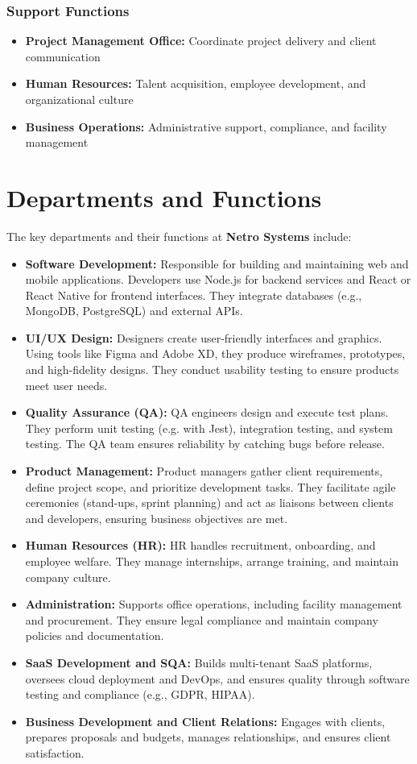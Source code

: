 \documentclass[12pt,a4paper]{report}
\newcommand{\company}[1]{\textcolor{companycolor}{\textbf{#1}}}
\newcommand{\skill}[1]{\textcolor{skillcolor}{\textbf{#1}}}
\newenvironment{coloritemize}
{\begin{itemize}[label=\textcolor{primaryblue}{$\bullet$}]}
{\end{itemize}}
\begin{document}
\subsubsection{Support Functions}
\begin{coloritemize}
    \item \skill{Project Management Office:} Coordinate project delivery and client communication
    \item \skill{Human Resources:} Talent acquisition, employee development, and organizational culture
    \item \skill{Business Operations:} Administrative support, compliance, and facility management
\end{coloritemize}

\section{Departments and Functions}
The key departments and their functions at \company{Netro Systems} include:
\begin{coloritemize}
    \item \skill{Software Development:} Responsible for building and maintaining web and mobile applications. Developers use Node.js for backend services and React or React Native for frontend interfaces. They integrate databases (e.g., MongoDB, PostgreSQL) and external APIs.
    \item \skill{UI/UX Design:} Designers create user-friendly interfaces and graphics. Using tools like Figma and Adobe XD, they produce wireframes, prototypes, and high-fidelity designs. They conduct usability testing to ensure products meet user needs.
    \item \skill{Quality Assurance (QA):} QA engineers design and execute test plans. They perform unit testing (e.g. with Jest), integration testing, and system testing. The QA team ensures reliability by catching bugs before release.
    \item \skill{Product Management:} Product managers gather client requirements, define project scope, and prioritize development tasks. They facilitate agile ceremonies (stand-ups, sprint planning) and act as liaisons between clients and developers, ensuring business objectives are met.
    \item \skill{Human Resources (HR):} HR handles recruitment, onboarding, and employee welfare. They manage internships, arrange training, and maintain company culture.
    \item \skill{Administration:} Supports office operations, including facility management and procurement. They ensure legal compliance and maintain company policies and documentation.
    \item \skill{SaaS Development and SQA:} Builds multi-tenant SaaS platforms, oversees cloud deployment and DevOps, and ensures quality through software testing and compliance (e.g., GDPR, HIPAA).
    \item \skill{Business Development and Client Relations:} Engages with clients, prepares proposals and budgets, manages relationships, and ensures client satisfaction.
\end{coloritemize}
\end{document}
